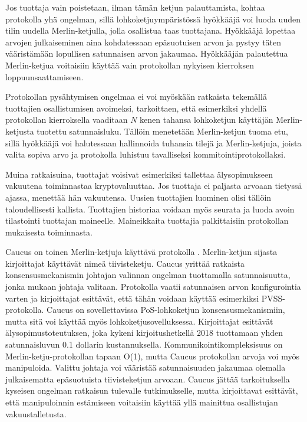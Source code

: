 Jos tuottaja vain poistetaan, ilman tämän ketjun palauttamista, kohtaa protokolla yhä ongelman, sillä lohkoketjuympäristössä hyökkääjä voi luoda uuden tilin uudella Merlin-ketjulla, jolla osallistua taas tuottajana. Hyökkääjä lopettaa arvojen julkaiseminen aina kohdatessaan epäsuotuisen arvon ja pystyy täten vääristämään lopullisen satunnaisen arvon jakaumaa. Hyökkääjän palautettua Merlin-ketjua voitaisiin käyttää vain protokollan nykyisen kierroksen loppuunsaattamiseen.

Protokollan pysähtymisen ongelmaa ei voi myöskään ratkaista tekemällä tuottajien osallistumisen avoimeksi, tarkoittaen, että esimerkiksi yhdellä protokollan kierroksella vaaditaan $N$ kenen tahansa lohkoketjun käyttäjän Merlin-ketjusta tuotettu satunnaisluku. Tällöin menetetään Merlin-ketjun tuoma etu, sillä hyökkääjä voi halutessaan hallinnoida tuhansia tilejä ja Merlin-ketjuja, joista valita sopiva arvo ja protokolla luhistuu tavalliseksi kommitointiprotokollaksi.

Muina ratkaisuina, tuottajat voisivat esimerkiksi tallettaa älysopimukseen vakuutena toiminnastaa kryptovaluuttaa. Jos tuottaja ei paljasta arvoaan tietyssä ajassa, menettää hän vakuutensa. Uusien tuottajien luominen olisi tällöin taloudellisesti kallista. Tuottajien historiaa voidaan myös seurata ja luoda avoin tilastointi tuottajan maineelle. Maineikkaita tuottajia palkittaisiin protokollan mukaisesta toiminnasta. 

Caucus on toinen Merlin-ketjuja käyttävä protokolla \cite{DBLP:journals/corr/abs-1801-07965}. Merlin-ketjun sijasta kirjoittajat käyttävät nimeä tiivisteketju. Caucus yrittää ratkaista konsensusmekanismin johtajan valinnan ongelman tuottamalla satunnaisuutta, jonka mukaan johtaja valitaan. Protokolla vaatii satunnaisen arvon konfigurointia varten ja kirjoittajat esittävät, että tähän voidaan käyttää esimerkiksi PVSS-protokolla. Caucus on sovellettavissa PoS-lohkoketjun konsensusmekanismiin, mutta sitä voi käyttää myös lohkoketjusovelluksessa. Kirjoittajat esittävät älysopimustoteutuksen, joka kykeni kirjoitushetkellä 2018 tuottamaan yhden satunnaisluvun 0.1 dollarin kustannuksella. Kommunikointikompleksisuus on Merlin-ketju-protokollan tapaan O(1), mutta Caucus protokollan arvoja voi myös manipuloida. Valittu johtaja voi vääristää satunnaisuuden jakaumaa olemalla julkaisematta epäsuotuista tiivisteketjun arvoaan. Caucus jättää tarkoituksella kyseisen ongelman ratkaisun tulevalle tutkimukselle, mutta kirjoittavat esittävät, että manipuloinnin estämiseen voitaisiin käyttää yllä mainittua osallistujan vakuustalletusta.

